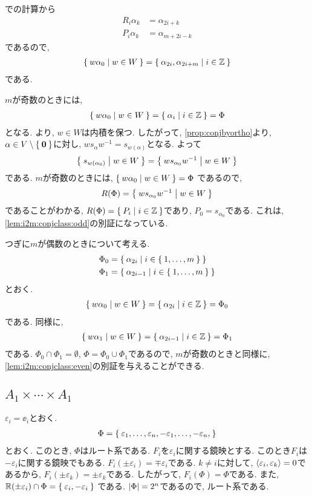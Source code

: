 での計算から
\begin{align*}
  R_i\alpha_k& =\alpha_{2i+k}\\
  P_i\alpha_k&=\alpha_{m+2i-k}
\end{align*}
であるので,
\begin{align*}
\Set{w\alpha_0 | w\in W} = \Set{\alpha_{2i}, \alpha_{2i+m}| i \in \mathbb{Z}}
\end{align*}
である.

$m$が奇数のときには,
\begin{align*}
\Set{w\alpha_0 | w\in W} = \Set{\alpha_{i}| i \in \mathbb{Z}}=\Phi
\end{align*}
となる.
より, $w\in W$は内積を保つ.
したがって, \cref{prop:conjbyortho}より,
  $\alpha\in V\setminus\Set{\boldsymbol{0}}$に対し,
$ws_\alpha w^{-1}=s_{w(\alpha)}$となる.
よって
\begin{align*}
\Set{s_{w(\alpha_0)}|w\in W}=\Set{ws_{\alpha_0} w^{-1}|w\in W}
\end{align*}
である.
$m$が奇数のときには,
$\Set{w\alpha_0 | w\in W}=\Phi$
であるので,
\begin{align*}
  R(\Phi)=\Set{ws_{\alpha_0} w^{-1}|w\in W}
\end{align*}
であることがわかる, $R(\Phi)=\Set{P_i|i\in \mathbb{Z}}$であり,
$P_0=s_{\alpha_0}$である.
これは, \cref{lem:i2m:conjclass:odd}の別証になっている.

つぎに$m$が偶数のときについて考える.
\begin{align*}
\Phi_0&=\Set{\alpha_{2i}| i \in \Set{1,\ldots,m}}\\
\Phi_1&=\Set{\alpha_{2i-1}| i \in \Set{1,\ldots,m}}\\
\end{align*}
とおく.
\begin{align*}
 \Set{w\alpha_0 | w\in W}
  = \Set{\alpha_{2i}| i \in \mathbb{Z}}=\Phi_0
\end{align*}
である.
同様に,
\begin{align*}
\Set{w\alpha_1 | w\in W}
  = \Set{\alpha_{2i-1}| i \in \mathbb{Z}}=\Phi_1
\end{align*}
である. $\Phi_0\cap \Phi_1=\emptyset$, $\Phi=\Phi_0\cup \Phi_1$であるので,
$m$が奇数のときと同様に,
\cref{lem:i2m:conjclass:even}の別証を与えることができる.

\subsection{$A_{1}\times\cdots\times A_{1}$}
\label{ex:a1n:root}
$\varepsilon_i=\ee_i$とおく.
\begin{align*}
\Phi=\Set{\varepsilon_1,\ldots,\varepsilon_n,-\varepsilon_1,\ldots,-\varepsilon_n,}
\end{align*}
とおく.  このとき,
$\Phi$はルート系である.
$F_i$を$\varepsilon_i$に関する鏡映とする.
このとき$F_i$は$-\varepsilon_i$に関する鏡映でもある.
$F_i(\pm\varepsilon_i)=\mp\varepsilon_i$である. 
$k\neq i$に対して, $\Braket{\varepsilon_i,\varepsilon_k}=0$であるから,
$F_i(\pm\varepsilon_k)=\pm\varepsilon_k$である.
したがって, $F_i(\Phi)=\Phi$である.
また, $\mathbb{R}(\pm\varepsilon_i)\cap \Phi=\Set{\varepsilon_i,-\varepsilon_i}$
である.
$\left|\Phi\right|=2^n$であるので, ルート系である.

